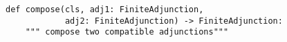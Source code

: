 \begin{verbatim}
def compose(cls, adj1: FiniteAdjunction,
            adj2: FiniteAdjunction) -> FiniteAdjunction:
    """ compose two compatible adjunctions"""
\end{verbatim}